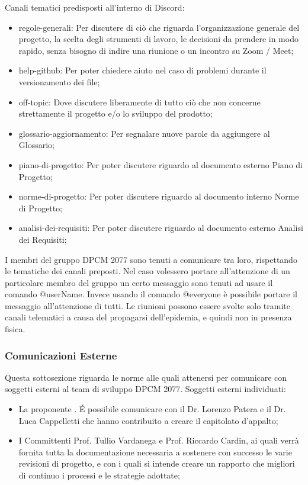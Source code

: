 Canali tematici predisposti all'interno di Discord:
\begin{itemize}
\item{regole-generali: Per discutere di ciò che riguarda l’organizzazione generale del progetto, la scelta degli strumenti di lavoro, le decisioni da prendere in modo rapido, senza bisogno di indire una riunione o un incontro  su Zoom / Meet;}
\item{help-github: Per poter chiedere aiuto nel caso di problemi durante il versionamento dei file;}
\item{off-topic: Dove discutere liberamente di tutto ciò che non concerne strettamente il progetto e/o lo sviluppo del prodotto;}
\item{glossario-aggiornamento: Per segnalare nuove parole da aggiungere al Glossario;}
\item{piano-di-progetto: Per poter discutere riguardo al documento esterno Piano di Progetto;}
\item{norme-di-progetto: Per poter discutere riguardo al documento interno Norme di Progetto;}
\item{analisi-dei-requisiti: Per poter discutere riguardo al documento esterno Analisi dei Requisiti;}
\end{itemize}
I membri del gruppo DPCM 2077 sono tenuti a comunicare tra loro, rispettando le tematiche dei canali preposti. Nel caso volessero portare all’attenzione di un particolare membro del gruppo un certo messaggio sono tenuti ad usare
il comando @userName.
Invece usando il comando @everyone è possibile portare il messaggio all'attenzione di tutti.
Le riunioni possono essere svolte solo tramite canali telematici a causa del propagarsi dell'epidemia, e quindi non in presenza fisica.

\subsubsection{Comunicazioni Esterne}
Questa sottosezione riguarda le norme alle quali attenersi per comunicare con soggetti esterni al team di sviluppo DPCM 2077.
Soggetti esterni individuati:
\begin{itemize}
\item{La proponente . \'E possibile comunicare con il Dr. Lorenzo Patera e il Dr. Luca Cappelletti che hanno contribuito a creare il capitolato d'appalto;}
\item{I Committenti Prof. Tullio Vardanega e Prof. Riccardo Cardin, ai quali verrà fornita tutta la documentazione necessaria a sostenere con successo le varie revisioni di progetto, e con i quali si intende creare un rapporto che migliori 
di continuo i processi e le strategie adottate;}
\end{itemize}

